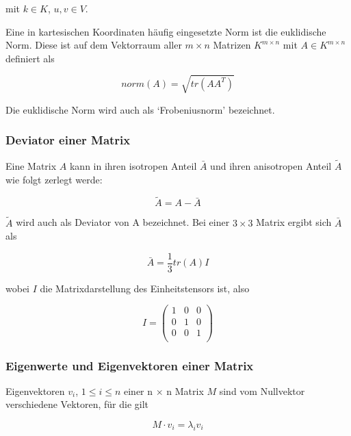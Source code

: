 \documentclass[a4paper,fontsize=12pt,toc=bib,halfparskip]{scrartcl}
\begin{document}
mit $k \in K$, $u,v \in V$.


Eine in kartesischen Koordinaten h\"aufig eingesetzte Norm ist die euklidische Norm. Diese ist auf dem Vektorraum aller $m \times n$ Matrizen $K^{m\times n}$ mit $A \in K^{m\times n}$ definiert als

\begin{equation}
	norm(A) = \sqrt{tr(AA^T)}
\end{equation}

Die euklidische Norm wird auch als `Frobeniusnorm' bezeichnet.

\subsubsection{Deviator einer Matrix}
Eine Matrix $A$ kann in ihren isotropen Anteil $\bar{A}$ und ihren anisotropen Anteil $\tilde{A}$ wie folgt zerlegt werde:

\begin{equation}
\tilde{A} = A - \bar{A}
\end{equation}

$\tilde{A}$ wird auch als Deviator von A bezeichnet. Bei einer $3\times 3$ Matrix ergibt sich $\bar{A}$ als

\begin{equation}
\bar{A} = \frac{1}{3}tr(A)I
\end{equation}

wobei $I$ die Matrixdarstellung des Einheitstensors ist, also

\begin{equation}
	I = 	
	\begin{pmatrix}
		1 & 0 & 0 \\
		0 & 1 & 0 \\
		0 & 0 & 1 \\
	\end{pmatrix}
\end{equation}

\subsubsection{Eigenwerte und Eigenvektoren einer Matrix}

Eigenvektoren $v_i$, $1\leq i\leq n$ einer n $\times$ n Matrix $M$ sind vom Nullvektor verschiedene Vektoren, f\"ur die gilt

\begin{equation}
	M \cdot v_i = \lambda_i v_i
\end{equation}
\end{document}
